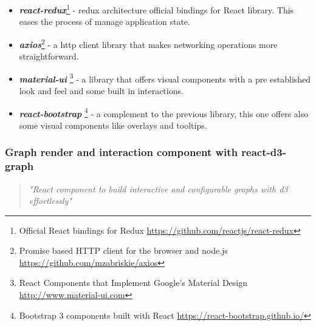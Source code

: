 \begin{itemize}
    \item \textit{\textbf{react-redux}}\footnote{Official React bindings for Redux \url{https://github.com/reactjs/react-redux}} - redux architecture official bindings for React library. This eases the process of manage application state.
    \item \textit{\textbf{axios}}\footnote{Promise based HTTP client for the browser and node.js \url{https://github.com/mzabriskie/axios}} - a http client library that makes networking operations more straightforward.
    \item \textit{\textbf{material-ui}} \footnote{React Components that Implement Google's Material Design \url{http://www.material-ui.com}} - a library that offers visual components with a pre established look and feel and some built in interactions.
    \item \textit{\textbf{react-bootstrap}} \footnote{Bootstrap 3 components built with React \url{https://react-bootstrap.github.io/}} - a complement to the previous library, this one offers also some visual components like overlays and tooltips.
\end{itemize}

\subsubsection{Graph render and interaction component with react-d3-graph}

\begin{quote}
\textit{"React component to build interactive and configurable graphs with d3 effortlessly"}
\end{quote}

